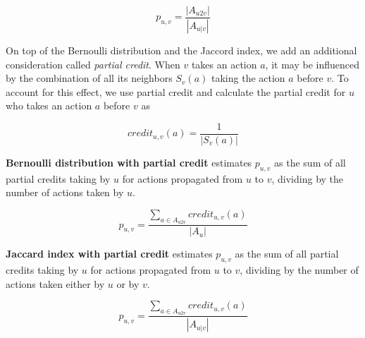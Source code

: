 $$p_{u,v} = \frac{|A_{u2v}|}{|A_{u|v}|}$$ 

On top of the Bernoulli distribution and the Jaccord index,
we add an additional consideration called {\em partial credit}.
When $v$ takes an action $a$, it may be influenced by the combination of all its neighbors $S_v(a)$ 
taking the action $a$ before $v$. %
To account for this effect, we use partial credit 
and calculate the partial credit for $u$ who takes an action $a$ before $v$ as 

$$credit_{u,v}(a) = \frac{1}{|S_v(a)|}$$

{\bf Bernoulli distribution with partial credit} 
estimates $p_{u,v}$ as the sum of all partial credits taking by $u$ for actions propagated from $u$ to $v$, 
dividing by the number of actions taken by $u$. 

$$p_{u,v} = \frac{\sum\limits_{a \in A_{u2v}}{credit_{u,v}(a)}}{|A_u|}$$

{\bf Jaccard index with partial credit} 
estimates $p_{u,v}$ as the sum of all partial credits taking by $u$ for actions propagated from $u$ to $v$, 
dividing by the number of actions taken either by $u$ or by $v$. 

$$p_{u,v} = \frac{\sum\limits_{a \in A_{u2v}}{credit_{u,v}(a)}}{|A_{u|v}|}$$




